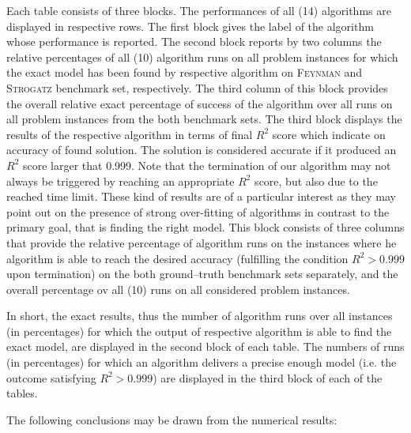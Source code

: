 \documentclass{bmcart}
\begin{document}
Each table consists of three blocks. The performances of all (14) algorithms are displayed in respective rows.  
The first block gives the label of the algorithm  whose performance is reported. The second block reports by two columns the relative percentages of all (10) algorithm runs on all problem instances for which the exact model has been found by respective algorithm  on \textsc{Feynman} and \textsc{Strogatz} benchmark set, respectively. The third column of this block provides the overall   relative exact percentage of success of the algorithm over all runs on all problem instances from the both benchmark sets. The third block displays the results of the respective algorithm in terms of   final $R^2$ score which indicate  on accuracy of found solution. The solution is considered accurate if it     produced an $R^2$ score larger that  0.999.  Note that the termination of our algorithm may not always be triggered by reaching an appropriate $R^2$ score, but also due to the reached time limit. These kind of results are of a particular interest as they may point out on the presence of strong over-fitting of algorithms in contrast to the primary goal, that is finding the right model. This block consists of three columns that provide the relative percentage of algorithm runs on the instances where he algorithm is able to reach the desired accuracy (fulfilling the condition $R^2 > 0.999$ upon termination) on the both ground--truth benchmark sets separately, and the overall percentage ov all (10) runs on all considered problem instances. 

In short, the exact results, thus the number of algorithm runs over all instances (in percentages) for which the output of respective algorithm is able to find the exact model, are displayed in the second block of each  table. The numbers of runs   (in percentages) for which an algorithm  delivers a precise enough model (i.e. the outcome satisfying $R^2>  0.999$) are displayed in the third block of each of the tables. 

The following conclusions may be drawn from the numerical results: 
\end{document}
